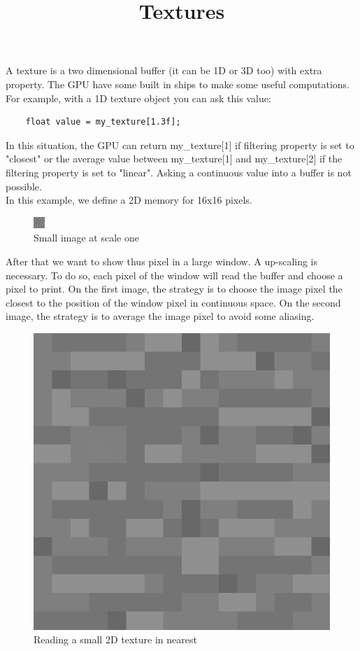 \documentclass{article}
\begin{document}
\title{Textures}
\maketitle

A texture is a two dimensional buffer (it can be 1D or 3D too) with extra property. The GPU have some built in ships to make some useful computations. For example, with a 1D texture object you can ask this value:
\begin{lstlisting}
	float value = my_texture[1.3f];
\end{lstlisting}
In this situation, the GPU can return my\_texture[1] if filtering property is set to "closest" or the average value between my\_texture[1] and my\_texture[2] if the filtering property is set to "linear". Asking a continuous value into a buffer is not possible.\\
In this example, we define a 2D memory for 16x16 pixels.
\begin{figure}[H]
	\centering
	\includegraphics[scale=1]{figures/stone.png}
	\caption{Small image at scale one}
\end{figure}
After that we want to show thus pixel in a large window. A up-scaling is necessary. To do so, each pixel of the window will read the buffer and choose a pixel to print. On the first image, the strategy is to choose the image pixel the closest to the position of the window pixel in continuous space. On the second image, the strategy is to average the image pixel to avoid some aliasing.
\begin{figure}[H]
	\centering
	\includegraphics[scale=0.4]{figures/nearest.png}
	\caption{Reading a small 2D texture in nearest}
\end{figure}
\end{document}

